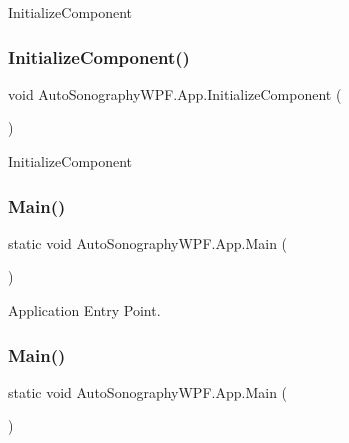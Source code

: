 Initialize\+Component 

\hypertarget{class_auto_sonography_w_p_f_1_1_app_a5878d4ccc5b6d4f1343b839cfa9babbb}{}\label{class_auto_sonography_w_p_f_1_1_app_a5878d4ccc5b6d4f1343b839cfa9babbb} 
\subsubsection{\texorpdfstring{Initialize\+Component()}{InitializeComponent()}\hspace{0.1cm}{\footnotesize\ttfamily [4/4]}}
{\footnotesize\ttfamily void Auto\+Sonography\+W\+P\+F.\+App.\+Initialize\+Component (\begin{DoxyParamCaption}{ }\end{DoxyParamCaption})}



Initialize\+Component 

\hypertarget{class_auto_sonography_w_p_f_1_1_app_a78f9df146a506989aad70cdf7863bd1e}{}\label{class_auto_sonography_w_p_f_1_1_app_a78f9df146a506989aad70cdf7863bd1e} 
\subsubsection{\texorpdfstring{Main()}{Main()}\hspace{0.1cm}{\footnotesize\ttfamily [1/4]}}
{\footnotesize\ttfamily static void Auto\+Sonography\+W\+P\+F.\+App.\+Main (\begin{DoxyParamCaption}{ }\end{DoxyParamCaption})\hspace{0.3cm}{\ttfamily [static]}}



Application Entry Point. 

\hypertarget{class_auto_sonography_w_p_f_1_1_app_a78f9df146a506989aad70cdf7863bd1e}{}\label{class_auto_sonography_w_p_f_1_1_app_a78f9df146a506989aad70cdf7863bd1e} 
\subsubsection{\texorpdfstring{Main()}{Main()}\hspace{0.1cm}{\footnotesize\ttfamily [2/4]}}
{\footnotesize\ttfamily static void Auto\+Sonography\+W\+P\+F.\+App.\+Main (\begin{DoxyParamCaption}{ }\end{DoxyParamCaption})\hspace{0.3cm}{\ttfamily [static]}}



